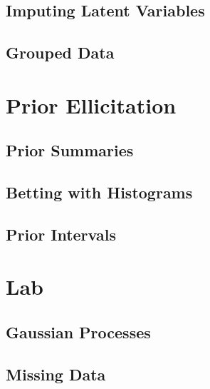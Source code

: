 \documentclass[
]{book}
\begin{document}
\hypertarget{imputing-latent-variables}{%
\subsection{Imputing Latent Variables}\label{imputing-latent-variables}}

\hypertarget{grouped-data}{%
\subsection{Grouped Data}\label{grouped-data}}

\hypertarget{prior-ellicitation}{%
\section{Prior Ellicitation}\label{prior-ellicitation}}

\hypertarget{prior-summaries}{%
\subsection{Prior Summaries}\label{prior-summaries}}

\hypertarget{betting-with-histograms}{%
\subsection{Betting with Histograms}\label{betting-with-histograms}}

\hypertarget{prior-intervals}{%
\subsection{Prior Intervals}\label{prior-intervals}}

\hypertarget{lab-4}{%
\section{Lab}\label{lab-4}}

\hypertarget{gaussian-processes-1}{%
\subsection{Gaussian Processes}\label{gaussian-processes-1}}

\hypertarget{missing-data}{%
\subsection{Missing Data}\label{missing-data}}

  
\end{document}
